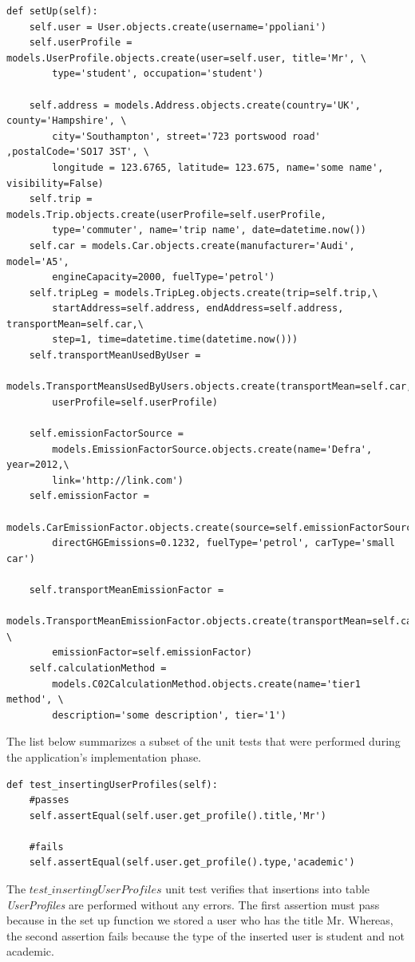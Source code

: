 \begin{verbatim}
def setUp(self):
    self.user = User.objects.create(username='ppoliani')
    self.userProfile = models.UserProfile.objects.create(user=self.user, title='Mr', \
        type='student', occupation='student')

    self.address = models.Address.objects.create(country='UK', county='Hampshire', \
        city='Southampton', street='723 portswood road' ,postalCode='SO17 3ST', \
        longitude = 123.6765, latitude= 123.675, name='some name', visibility=False)
    self.trip = models.Trip.objects.create(userProfile=self.userProfile,
        type='commuter', name='trip name', date=datetime.now())
    self.car = models.Car.objects.create(manufacturer='Audi', model='A5',
        engineCapacity=2000, fuelType='petrol')
    self.tripLeg = models.TripLeg.objects.create(trip=self.trip,\
        startAddress=self.address, endAddress=self.address, transportMean=self.car,\
        step=1, time=datetime.time(datetime.now()))
    self.transportMeanUsedByUser =
        models.TransportMeansUsedByUsers.objects.create(transportMean=self.car,\
        userProfile=self.userProfile)

    self.emissionFactorSource =
        models.EmissionFactorSource.objects.create(name='Defra', year=2012,\
        link='http://link.com')
    self.emissionFactor =
        models.CarEmissionFactor.objects.create(source=self.emissionFactorSource,
        directGHGEmissions=0.1232, fuelType='petrol', carType='small car')

    self.transportMeanEmissionFactor =
        models.TransportMeanEmissionFactor.objects.create(transportMean=self.car, \
        emissionFactor=self.emissionFactor)
    self.calculationMethod =
        models.C02CalculationMethod.objects.create(name='tier1 method', \
        description='some description', tier='1')

\end{verbatim}

The list below summarizes a subset of the unit tests that were performed during the application's implementation phase.


\begin{verbatim}
def test_insertingUserProfiles(self):
    #passes
    self.assertEqual(self.user.get_profile().title,'Mr')

    #fails
    self.assertEqual(self.user.get_profile().type,'academic')
\end{verbatim}

The $test\_insertingUserProfiles$ unit test verifies that insertions into table \emph{UserProfiles} are performed without any errors. The first assertion must pass because in the set up function we stored a user who has the title Mr. Whereas, the second assertion fails because the type of the inserted user is student and not academic.



